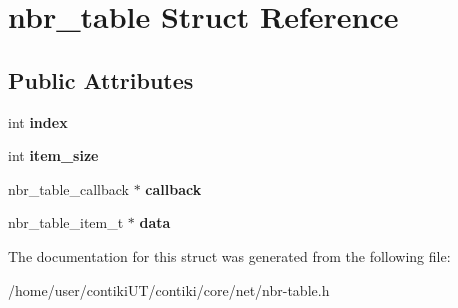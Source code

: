 \hypertarget{structnbr__table}{}\section{nbr\+\_\+table Struct Reference}
\label{structnbr__table}
\subsection*{Public Attributes}
\begin{DoxyCompactItemize}
\item 
\hypertarget{structnbr__table_a0940f3222b32f17963b4a239068c411e}{}int {\bfseries index}\label{structnbr__table_a0940f3222b32f17963b4a239068c411e}

\item 
\hypertarget{structnbr__table_a04c155c05fdf791cf4c0d4fb0b2a3c1a}{}int {\bfseries item\+\_\+size}\label{structnbr__table_a04c155c05fdf791cf4c0d4fb0b2a3c1a}

\item 
\hypertarget{structnbr__table_a9b54d53d3fe11e02cd11416b2073d627}{}nbr\+\_\+table\+\_\+callback $\ast$ {\bfseries callback}\label{structnbr__table_a9b54d53d3fe11e02cd11416b2073d627}

\item 
\hypertarget{structnbr__table_a95ffbcfc1330ca6e3c45448f3ce60349}{}nbr\+\_\+table\+\_\+item\+\_\+t $\ast$ {\bfseries data}\label{structnbr__table_a95ffbcfc1330ca6e3c45448f3ce60349}

\end{DoxyCompactItemize}


The documentation for this struct was generated from the following file\+:\begin{DoxyCompactItemize}
\item 
/home/user/contiki\+U\+T/contiki/core/net/nbr-\/table.\+h\end{DoxyCompactItemize}
